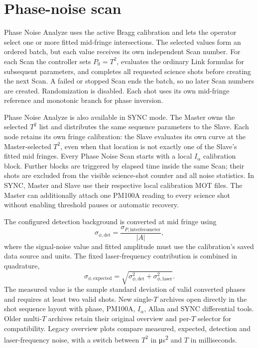 \documentclass[11pt,oneside,openany]{book}
\begin{document}
\section{Phase-noise scan}
Phase Noise Analyze uses the active Bragg calibration and lets the operator select one or
more fitted mid-fringe intersections. The selected values form an ordered batch, but each
value receives its own independent Scan number. For each Scan the controller sets
$P_0=T^2$, evaluates the ordinary Link formulas for subsequent parameters, and completes
all requested science shots before creating the next Scan. A failed or stopped Scan ends
the batch, so no later Scan numbers are created. Randomization is disabled.
Each shot uses its own mid-fringe reference and monotonic branch for phase inversion.

Phase Noise Analyze is also available in SYNC mode. The Master owns the selected
$T^2$ list and distributes the same sequence parameters to the Slave. Each node retains
its own fringe calibration: the Slave evaluates its own curve at the Master-selected
$T^2$, even when that location is not exactly one of the Slave's fitted mid fringes.
Every Phase Noise Scan starts with a local $I_\alpha$ calibration block. Further blocks
are triggered by elapsed time inside the same Scan; their shots are excluded from the
visible science-shot counter and all noise statistics. In SYNC, Master and Slave use
their respective local calibration MOT files. The Master can additionally attach one
PM100A reading to every science shot without enabling threshold pauses or automatic
recovery.

The configured detection background is converted at mid fringe using
\begin{equation}
  \sigma_{\phi,\mathrm{det}}=\frac{\sigma_{P,\mathrm{interferometer}}}{|A|},
\end{equation}
where the signal-noise value and fitted amplitude must use the calibration's saved data
source and units. The fixed laser-frequency contribution is combined in quadrature,
\begin{equation}
  \sigma_{\phi,\mathrm{expected}}=
  \sqrt{\sigma_{\phi,\mathrm{det}}^2+\sigma_{\phi,\mathrm{laser}}^2}.
\end{equation}
The measured value is the sample standard deviation of valid converted phases and
requires at least two valid shots. New single-$T$ archives open directly in the shot
sequence layout with phase, PM100A, $I_\alpha$, Allan and SYNC differential tools. Older
multi-$T$ archives retain their original overview and per-$T$ selector for compatibility.
Legacy overview plots compare measured, expected, detection and laser-frequency noise, with a switch between $T^2$ in
\si{\micro\second\squared} and $T$ in milliseconds.
\end{document}
